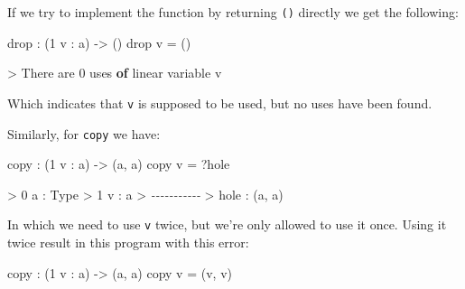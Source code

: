 \documentclass[
]{article}
\newenvironment{Shaded}{}{}
\newcommand{\CommentTok}[1]{\textcolor[rgb]{0.38,0.63,0.69}{\textit{#1}}}
\newcommand{\DataTypeTok}[1]{\textcolor[rgb]{0.56,0.13,0.00}{#1}}
\newcommand{\DecValTok}[1]{\textcolor[rgb]{0.25,0.63,0.44}{#1}}
\newcommand{\FunctionTok}[1]{\textcolor[rgb]{0.02,0.16,0.49}{#1}}
\newcommand{\KeywordTok}[1]{\textcolor[rgb]{0.00,0.44,0.13}{\textbf{#1}}}
\newcommand{\NormalTok}[1]{#1}
\newcommand{\OperatorTok}[1]{\textcolor[rgb]{0.40,0.40,0.40}{#1}}
\newcommand{\OtherTok}[1]{\textcolor[rgb]{0.00,0.44,0.13}{#1}}
\begin{document}
If we try to implement the function by returning \texttt{()} directly we
get the following:

\begin{Shaded}
\begin{Highlighting}[]
\FunctionTok{drop} \OperatorTok{:}\NormalTok{ (}\DecValTok{1}\NormalTok{ v }\OperatorTok{:}\NormalTok{ a) }\OtherTok{{-}\textgreater{}}\NormalTok{ ()}
\FunctionTok{drop}\NormalTok{ v }\OtherTok{=}\NormalTok{ ()}
\end{Highlighting}
\end{Shaded}

\begin{Shaded}
\begin{Highlighting}[]
\OperatorTok{\textgreater{}} \DataTypeTok{There}\NormalTok{ are }\DecValTok{0}\NormalTok{ uses }\KeywordTok{of}\NormalTok{ linear variable v}
\end{Highlighting}
\end{Shaded}

Which indicates that \texttt{v} is supposed to be used, but no uses have
been found.

Similarly, for \texttt{copy} we have:

\begin{Shaded}
\begin{Highlighting}[]
\NormalTok{copy }\OperatorTok{:}\NormalTok{ (}\DecValTok{1}\NormalTok{ v }\OperatorTok{:}\NormalTok{ a) }\OtherTok{{-}\textgreater{}}\NormalTok{ (a, a)}
\NormalTok{copy v }\OtherTok{=} \OperatorTok{?}\NormalTok{hole}
\end{Highlighting}
\end{Shaded}

\begin{Shaded}
\begin{Highlighting}[]
\OperatorTok{\textgreater{}} \DecValTok{0}\NormalTok{ a }\OperatorTok{:} \DataTypeTok{Type}
\OperatorTok{\textgreater{}} \DecValTok{1}\NormalTok{ v }\OperatorTok{:}\NormalTok{ a}
\OperatorTok{\textgreater{}} \CommentTok{{-}{-}{-}{-}{-}{-}{-}{-}{-}{-}{-}}
\OperatorTok{\textgreater{}}\NormalTok{ hole }\OperatorTok{:}\NormalTok{ (a, a)}
\end{Highlighting}
\end{Shaded}

In which we need to use \texttt{v} twice, but we're only allowed to use
it once. Using it twice result in this program with this error:

\begin{Shaded}
\begin{Highlighting}[]
\NormalTok{copy }\OperatorTok{:}\NormalTok{ (}\DecValTok{1}\NormalTok{ v }\OperatorTok{:}\NormalTok{ a) }\OtherTok{{-}\textgreater{}}\NormalTok{ (a, a)}
\NormalTok{copy v }\OtherTok{=}\NormalTok{ (v, v)}
\end{Highlighting}
\end{Shaded}
\end{document}
